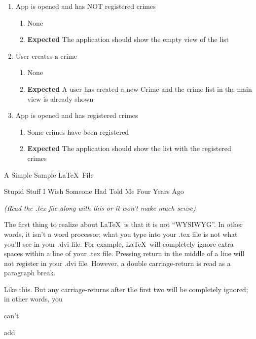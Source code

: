 \documentclass{article}
\begin{document}
\begin{enumerate}
  \item App is opened and has NOT registered crimes
  \begin{enumerate}
   \item \textbf{\pre} None
   \item \textbf{Expected} The application should show the empty view of the list
  \end{enumerate}
    
  \item User creates a crime
  \begin{enumerate}
   \item \textbf{\pre} None
   \item \textbf{Expected} A user has created a new Crime and the crime list in the main view is already shown
  \end{enumerate}

  \item App is opened and has registered crimes
  \begin{enumerate}
   \item \textbf{\pre} Some crimes have been registered
   \item \textbf{Expected} The application should show the list with the registered crimes
  \end{enumerate}

\end{enumerate}



\centerline{\sc \large A Simple Sample \LaTeX\ File}
\vspace{.5pc}
\centerline{\sc Stupid Stuff I Wish Someone Had Told Me Four Years Ago}
\centerline{\it (Read the .tex file along with this or it won't 
  make much sense)}
\vspace{2pc}

The first thing to realize about \LaTeX\ is that it is not ``WYSIWYG''. 
In other words, it isn't a word processor; what you type into your 
.tex file is not what you'll see in your .dvi file.  For example, 
\LaTeX\ will      completely     ignore               extra
spaces    within                             a line of your .tex file.
Pressing return
in 
the 
middle 
of
a
line
will not register in your .dvi file. However, a double carriage-return
is read as a paragraph break.

Like this.  But any carriage-returns after the first two will be 
completely ignored; in other words, you 


can't 

add
\end{document}

